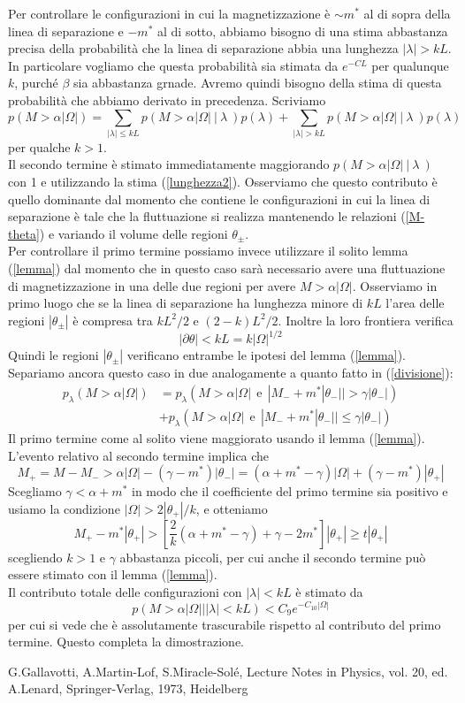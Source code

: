 \documentclass[aps,pre]{revtex4}
\newcommand{\beq}{\begin{equation}}
\newcommand{\eeq}{\end{equation}}
\begin{document}
\noindent
Per controllare le configurazioni in cui la magnetizzazione \`e $\sim m^*$ al di sopra della linea di separazione e $-m^*$ al di sotto, abbiamo bisogno di una stima abbastanza precisa della probabilit\`a che la linea di separazione abbia una lunghezza $|\lambda| > kL$. In particolare vogliamo che questa probabilit\`a sia stimata da $e^{-C L}$ per qualunque $k$, purch\'e $\beta$ sia abbastanza grnade. Avremo quindi bisogno della stima di questa probabilit\`a che abbiamo derivato in precedenza. Scriviamo
\beq
p(M > \alpha |\Omega| ) = \sum_{|\lambda| \leq kL} p(M > \alpha |\Omega| \ | \ \lambda \ ) p(\lambda) + \sum_{|\lambda| > kL} p(M > \alpha |\Omega| \ | \ \lambda \ ) p(\lambda)
\eeq
per qualche $k > 1$. \\
Il secondo termine \`e stimato immediatamente maggiorando $ p(M > \alpha |\Omega| \ | \ \lambda \ )$ con 1 e utilizzando la stima (\ref{lunghezza2}). Osserviamo che questo contributo \`e quello dominante dal momento che contiene le  configurazioni in cui la linea di separazione \`e tale che la fluttuazione si realizza mantenendo le relazioni (\ref{M-theta}) e variando il volume delle regioni $\theta_\pm$. \\
Per controllare il primo termine possiamo invece utilizzare il solito lemma (\ref{lemma}) dal momento che in questo caso sar\`a necessario avere una fluttuazione di magnetizzazione in una delle due regioni per avere $M > \alpha |\Omega|$. Osserviamo in primo luogo che se la linea di separazione ha lunghezza minore di $kL$ l'area delle regioni $|\theta_\pm|$ \`e compresa tra $kL^2 /2$ e $(2-k) L^2 /2$. Inoltre la loro frontiera verifica
\beq
|\partial \theta| < kL =k |\Omega|^{1/2}
\eeq
Quindi le regioni $|\theta_\pm|$ verificano entrambe le ipotesi del lemma (\ref{lemma}). Separiamo ancora questo caso in due analogamente a quanto fatto in (\ref{divisione}):
\beq
\begin{split}
p_\lambda(M > \alpha |\Omega| ) &= p_\lambda(M > \alpha |\Omega| \ \ \text{e} \ \  |M_- + m^* |\theta_-|| > \gamma |\theta_-|) \\
&+  p_\lambda(M > \alpha |\Omega| \ \ \text{e} \ \ |M_- + m^* |\theta_-|| \leq \gamma |\theta_-|)
\end{split}
\eeq
Il primo termine come al solito viene maggiorato usando il lemma (\ref{lemma}). L'evento relativo al secondo termine implica che
\beq
M_+ = M - M_- > \alpha |\Omega| - (\gamma - m^*) |\theta_-| = (\alpha + m^* - \gamma) |\Omega| + (\gamma - m^*) |\theta_+|
\eeq
Scegliamo $\gamma<\alpha + m^*$ in modo che il coefficiente del primo termine sia positivo e usiamo la condizione $|\Omega|>2 |\theta_+| / k $, e otteniamo
\beq
M_+ - m^* |\theta_+| > \left[ \frac{2}{k} (\alpha + m^* - \gamma) + \gamma - 2m^* \right] |\theta_+| \geq t |\theta_+|
\eeq
scegliendo $k>1$ e $\gamma$ abbastanza piccoli, per cui anche il secondo termine pu\`o essere stimato con il lemma (\ref{lemma}). \\
Il contributo totale delle configurazioni con $|\lambda|<kL$ \`e stimato da
\beq
p(M > \alpha |\Omega| | |\lambda|<kL ) < C_9 e^{-C_{10} |\Omega|}
\eeq
per cui si vede che \`e assolutamente trascurabile rispetto al contributo del primo termine. Questo completa la dimostrazione.


\begin{thebibliography}{99}

 G.Gallavotti, A.Martin-Lof, S.Miracle-Sol\'e, Lecture Notes in Physics, vol. 20, ed. A.Lenard, Springer-Verlag, 1973, Heidelberg

\end{thebibliography}
\end{document}
